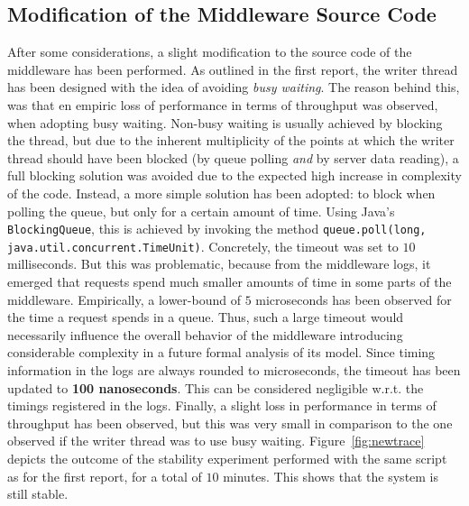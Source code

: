 \documentclass[11pt]{article}
\theoremstyle{definition}
\renewcommand\b[1]{{\bf{#1}}}
\renewcommand\t\texttt
\begin{document}
\clearpage
\begin{appendices}

\section{Modification of the Middleware Source Code}\label{app:code}

After some considerations, a slight modification to the source code of the middleware has been performed.
As outlined in the first report, the writer thread has been designed with the idea of avoiding \emph{busy waiting}.
The reason behind this, was that en empiric loss of performance in terms of throughput was observed, when adopting busy waiting.
Non-busy waiting is usually achieved by blocking the thread, but due to the inherent multiplicity of the points at which the writer thread should have been blocked (by queue polling \emph{and} by server data reading), a full blocking solution was avoided due to the expected high increase in complexity of the code.
Instead, a more simple solution has been adopted: to block when polling the queue, but only for a certain amount of time.
Using Java's \t{BlockingQueue}, this is achieved by invoking the method \t{queue.poll(long, java.util.concurrent.TimeUnit)}.
Concretely, the timeout was set to $10$ milliseconds.
But this was problematic, because from the middleware logs, it emerged that requests spend much smaller amounts of time in some parts of the middleware.
Empirically, a lower-bound of $5$ microseconds has been observed for the time a request spends in a queue.
Thus, such a large timeout would necessarily influence the overall behavior of the middleware introducing considerable complexity in a future formal analysis of its model.
Since timing information in the logs are always rounded to microseconds, the timeout has been updated to \b{100 nanoseconds}.
This can be considered negligible w.r.t. the timings registered in the logs.
Finally, a slight loss in performance in terms of throughput has been observed, but this was very small in comparison to the one observed if the writer thread was to use busy waiting.
Figure~\ref{fig:newtrace} depicts the outcome of the stability experiment performed with the same script as for the first report, for a total of $10$ minutes.
This shows that the system is still stable.


\end{appendices}
\end{document}
